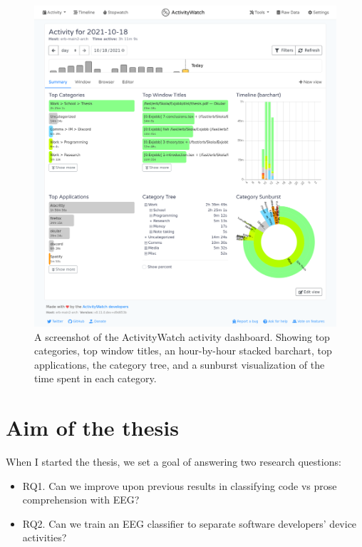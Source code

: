         \begin{figure}[h]
        \centering
        \includegraphics[width=14cm,frame]{img/screenshot-aw-activity.png}
        \caption{A screenshot of the ActivityWatch activity dashboard. Showing top categories, top window titles, an hour-by-hour stacked barchart, top applications, the category tree, and a sunburst visualization of the time spent in each category.}\label{fig:aw}
        \end{figure}


\section{Aim of the thesis}\label{section:aim}

    When I started the thesis, we set a goal of answering two research questions:

    \begin{itemize}
            \item RQ1. Can we improve upon previous results in classifying code vs prose comprehension with EEG\@?
            \item RQ2. Can we train an EEG classifier to separate software developers’ device activities?
    \end{itemize}

